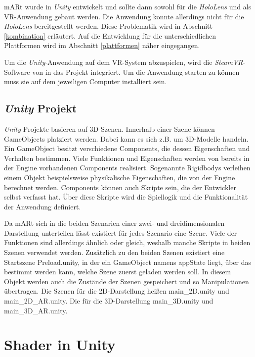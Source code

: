 mARt wurde in \textit{Unity} entwickelt und sollte dann sowohl für die \textit{HoloLens} und als VR-Anwendung gebaut werden. Die Anwendung konnte allerdings nicht für die \textit{HoloLens} bereitgestellt werden. Diese Problematik wird in Abschnitt \ref{kombination} erläutert. Auf die Entwicklung für die unterschiedlichen Plattformen wird im Abschnitt \ref{plattformen} näher eingegangen.

Um die \textit{Unity}-Anwendung auf dem VR-System abzuspielen, wird die \textit{SteamVR}-Software von \cite{steam} in das Projekt integriert. Um die Anwendung starten zu können muss sie auf dem jeweiligen Computer installiert sein.

\subsection{\textit{Unity} Projekt}

\textit{Unity} Projekte basieren auf 3D-Szenen. Innerhalb einer Szene können GameObjects platziert werden. Dabei kann es sich z.B. um 3D-Modelle handeln. Ein GameObject besitzt verschiedene Components, die dessen Eigenschaften und Verhalten bestimmen. Viele Funktionen und Eigenschaften werden von bereits in der Engine vorhandenen Components realisiert. Sogenannte Rigidbodys verleihen einem Objekt beispielsweise physikalische Eigenschaften, die von der Engine berechnet werden. Components können auch Skripte sein, die der Entwickler selbst verfasst hat. Über diese Skripte wird die Spiellogik und die Funktionalität der Anwendung definiert. 

Da mARt sich in die beiden Szenarien einer zwei- und dreidimensionalen Darstellung unterteilen lässt existiert für jedes Szenario eine Szene.
Viele der Funktionen sind allerdings ähnlich oder gleich, weshalb manche Skripte in beiden Szenen verwendet werden. 
Zusätzlich zu den beiden Szenen existiert eine Startszene Preload.unity, in der ein GameObject namens appState liegt, über das bestimmt werden kann, welche Szene zuerst geladen werden soll. In diesem Objekt werden auch die Zustände der Szenen gespeichert und so Manipulationen übertragen.
Die Szenen für die 2D-Darstellung heißen main\_2D.unity und main\_2D\_AR.unity. Die für die 3D-Darstellung main\_3D.unity und main\_3D\_AR.unity.



\section{Shader in Unity}

